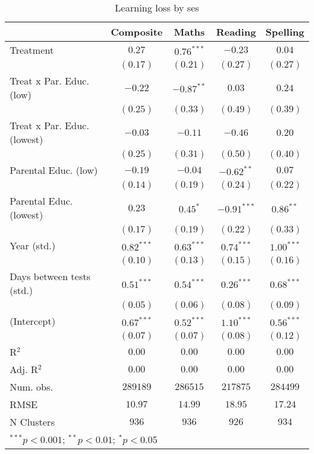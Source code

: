 
\begin{table}
\begin{center}
\begin{tabular}{l c c c c}
\hline
 & Composite & Maths & Reading & Spelling \\
\hline
Treatment                   & $0.27$       & $0.76^{***}$ & $-0.23$       & $0.04$       \\
                            & $(0.17)$     & $(0.21)$     & $(0.27)$      & $(0.27)$     \\
Treat x Par. Educ. (low)    & $-0.22$      & $-0.87^{**}$ & $0.03$        & $0.24$       \\
                            & $(0.25)$     & $(0.33)$     & $(0.49)$      & $(0.39)$     \\
Treat x Par. Educ. (lowest) & $-0.03$      & $-0.11$      & $-0.46$       & $0.20$       \\
                            & $(0.25)$     & $(0.31)$     & $(0.50)$      & $(0.40)$     \\
Parental Educ. (low)        & $-0.19$      & $-0.04$      & $-0.62^{**}$  & $0.07$       \\
                            & $(0.14)$     & $(0.19)$     & $(0.24)$      & $(0.22)$     \\
Parental Educ. (lowest)     & $0.23$       & $0.45^{*}$   & $-0.91^{***}$ & $0.86^{**}$  \\
                            & $(0.17)$     & $(0.19)$     & $(0.22)$      & $(0.33)$     \\
Year (std.)                 & $0.82^{***}$ & $0.63^{***}$ & $0.74^{***}$  & $1.00^{***}$ \\
                            & $(0.10)$     & $(0.13)$     & $(0.15)$      & $(0.16)$     \\
Days between tests (std.)   & $0.51^{***}$ & $0.54^{***}$ & $0.26^{***}$  & $0.68^{***}$ \\
                            & $(0.05)$     & $(0.06)$     & $(0.08)$      & $(0.09)$     \\
(Intercept)                 & $0.67^{***}$ & $0.52^{***}$ & $1.10^{***}$  & $0.56^{***}$ \\
                            & $(0.07)$     & $(0.07)$     & $(0.08)$      & $(0.12)$     \\
\hline
R$^2$                       & $0.00$       & $0.00$       & $0.00$        & $0.00$       \\
Adj. R$^2$                  & $0.00$       & $0.00$       & $0.00$        & $0.00$       \\
Num. obs.                   & $289189$     & $286515$     & $217875$      & $284499$     \\
RMSE                        & $10.97$      & $14.99$      & $18.95$       & $17.24$      \\
N Clusters                  & $936$        & $936$        & $926$         & $934$        \\
\hline
\multicolumn{5}{l}{\scriptsize{$^{***}p<0.001$; $^{**}p<0.01$; $^{*}p<0.05$}}
\end{tabular}
\caption{Learning loss by ses}
\label{tableses}
\end{center}
\end{table}
